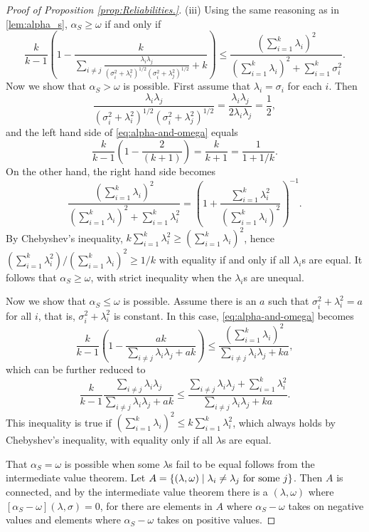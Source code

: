 \documentclass[twoside]{article}
\begin{document}
\begin{proof}[Proof of Proposition \ref{prop:Reliabilities.}]
(iii) 
Using the same reasoning as in \cref{lem:alpha_s}, $\alpha_{S}\geq\omega$ if
and only if 
\begin{equation}
\frac{k}{k-1}(1-\frac{k}{\sum_{i\neq j}\frac{\lambda_{i}\lambda_{j}}{(\sigma_{i}^{2}+\lambda_{i}^{2})^{1/2}(\sigma_{i}^{2}+\lambda_{j}^{2})^{1/2}}+k})\leq\frac{(\sum_{i=1}^{k}\lambda_{i})^{2}}{(\sum_{i=1}^{k}\lambda_{i})^{2}+\sum_{i=1}^{k}\sigma_{i}^{2}}.\label{eq:alpha-and-omega}
\end{equation}
Now we show that $\alpha_{S}>\omega$ is possible. First assume that
$\lambda_{i}=\sigma_{i}$ for each $i$. Then 
\[
\frac{\lambda_{i}\lambda_{j}}{(\sigma_{i}^{2}+\lambda_{i}^{2})^{1/2}(\sigma_{i}^{2}+\lambda_{j}^{2})^{1/2}}=\frac{\lambda_{i}\lambda_{j}}{2\lambda_{i}\lambda_{j}}=\frac{1}{2},
\]
and the left hand side of \cref{eq:alpha-and-omega} equals
\[
\frac{k}{k-1}\left(1-\frac{2}{(k+1)}\right)=\frac{k}{k+1}=\frac{1}{1+1/k}.
\]
On the other hand, the right hand side becomes
\[
\frac{(\sum_{i=1}^{k}\lambda_{i})^{2}}{(\sum_{i=1}^{k}\lambda_{i})^{2}+\sum_{i=1}^{k}\lambda_{i}^{2}}=\left(1+\frac{\sum_{i=1}^{k}\lambda_{i}^{2}}{(\sum_{i=1}^{k}\lambda_{i})^{2}}\right)^{-1}.
\]
By Chebyshev's inequality, $k\sum_{i=1}^{k}\lambda_{i}^{2}\geq(\sum_{i=1}^{k}\lambda_{i})^{2}$,
hence $(\sum_{i=1}^{k}\lambda_{i}^{2})/(\sum_{i=1}^{k}\lambda_{i})^{2}\geq1/k$
with equality if and only if all $\lambda_{i}$s are equal. It follows
that $\alpha_{S}\geq\omega$, with strict inequality when the $\lambda_{i}$s
are unequal.

Now we show that $\alpha_{S}\leq\omega$ is possible. Assume there
is an $a$ such that $\sigma_{i}^{2}+\lambda_{i}^{2}=a$ for all $i$,
that is, $\sigma_{i}^{2}+\lambda_{i}^{2}$ is constant. In this case,
\cref{eq:alpha-and-omega} becomes
\[
\frac{k}{k-1}(1-\frac{ak}{\sum_{i\neq j}\lambda_{i}\lambda_{j}+ak})\leq\frac{(\sum_{i=1}^{k}\lambda_{i})^{2}}{\sum_{i\neq j}\lambda_{i}\lambda_{j}+ka},
\]
which can be further reduced to
\[
\frac{k}{k-1}\frac{\sum_{i\neq j}\lambda_{i}\lambda_{j}}{\sum_{i\neq j}\lambda_{i}\lambda_{j}+ak}\leq\frac{\sum_{i\neq j}\lambda_{i}\lambda_{j}+\sum_{i=1}^{k}\lambda_{i}^{2}}{\sum_{i\neq j}\lambda_{i}\lambda_{j}+ka}.
\]
This inequality is true if $(\sum_{i=1}^{k}\lambda_{i})^{2}\leq k\sum_{i=1}^{k}\lambda_{i}^{2}$,
which always holds by Chebyshev's inequality, with equality only if
all $\lambda$s are equal.

That $\alpha_{S}=\omega$ is possible when some $\lambda$s fail to
be equal follows from the intermediate value theorem. 
Let $A=\{ (\lambda,\omega)\mid\lambda_{i}\neq\lambda_{j}\text{\textrm{ for some }}j\} $.
Then $A$ is connected, and by the intermediate value theorem there
is a $(\lambda,\omega)$ where $[\alpha_S-\omega](\lambda,\sigma)=0$,
for there are elements in $A$ where $\alpha_S-\omega$ takes on
negative values and elements where $\alpha_S-\omega$ takes on positive
values.
\end{proof}
\end{document}

